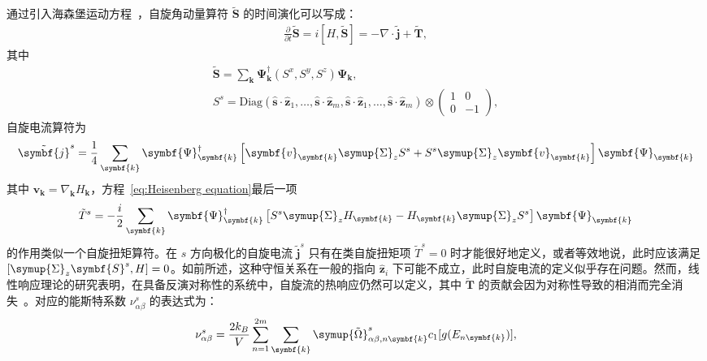     通过引入海森堡运动方程~\cite{matsumoto2011theoretical,matsumoto2011rotational,li2020intrinsic}，自旋角动量算符 $\tilde{\symbf{S}}$ 的时间演化可以写成：
    \begin{align}
        \frac{\partial}{\partial t}\tilde{\symbf{S}}=i[H,\tilde{\symbf{S}}]=-\nabla\cdot\tilde{\symbf{j}}+\tilde{\symbf{T}},
        \label{eq:Heisenberg equation}
    \end{align}
    其中
    \begin{gather}
        \tilde{\symbf{S}}=\sum_{\symbf{k}}\symbf{\Psi}^\dagger_{\symbf{k}}(S^x,S^y,S^z)\symbf{\Psi}_{\symbf{k}},\\
        S^{s}=\text{Diag}(\hat{\symbf{s}}\cdot\hat{\symbf{z}}_1,\dots,\hat{\symbf{s}}\cdot\hat{\symbf{z}}_m,\hat{\symbf{s}}\cdot\hat{\symbf{z}}_1,\dots,\hat{\symbf{s}}\cdot\hat{\symbf{z}}_m)\otimes
        \begin{pmatrix}
            1 & 0\\
            0 & -1
        \end{pmatrix},
    \end{gather}
    自旋电流算符为
    \begin{equation}
        \tilde{\symbf{j}}^s=\frac{1}{4}\sum_{\symbf{k}}\symbf{\Psi}_{\symbf{k}}^\dagger\left[\symbf{v}_{{\symbf{k}}}\symup{\Sigma}_z S^s+S^s\symup{\Sigma}_z\symbf{v}_{\symbf{k}}\right]\symbf{\Psi}_{\symbf{k}}
    \end{equation}
    其中 $\symbf{v}_{{\symbf{k}}}=\nabla_{\symbf{k}} H_{\symbf{k}}$，方程~\ref{eq:Heisenberg equation}最后一项
    \begin{equation}
        \tilde{T}^s=-\frac{i}{2}\sum_{\symbf{k}}\symbf{\Psi}_{\symbf{k}}^\dagger\left[S^s\symup{\Sigma}_z H_{\symbf{k}}-H_{\symbf{k}}\symup{\Sigma}_z S^s\right]\symbf{\Psi}_{\symbf{k}}
    \end{equation}
    的作用类似一个自旋扭矩算符。在 $s$ 方向极化的自旋电流 $\tilde{\symbf{j}}^s$ 只有在类自旋扭矩项 $\tilde{T}^s=0$ 时才能很好地定义，或者等效地说，此时应该满足 $[\symup{\Sigma}_z\symbf{S}^s, H]=0$。如前所述，这种守恒关系在一般的指向 $\hat{\symbf{z}}_i$ 下可能不成立，此时自旋电流的定义似乎存在问题。然而，线性响应理论的研究表明，在具备反演对称性的系统中，自旋流的热响应仍然可以定义，其中 $\tilde{\symbf{T}}$ 的贡献会因为对称性导致的相消而完全消失~\cite{li2020intrinsic}。对应的能斯特系数 $\nu^s_{\alpha\beta}$ 的表达式为：
    \begin{align}
        \nu^s_{\alpha\beta}=\frac{2k_B}{V}\sum_{n=1}^{2m}\sum_{{\symbf{k}}}\symup{\tilde{\Omega}}^s_{\alpha\beta,n{\symbf{k}}}c_1[g(E_{n{\symbf{k}}})],
        \label{eq:nu}
    \end{align}
